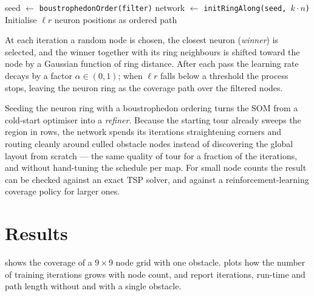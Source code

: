 \begin{algorithm}[H]
\caption{\texttt{generateCoveragePath} --- seeded SOM path planner}
seed $\leftarrow$ \texttt{boustrophedonOrder(filter)} 
network $\leftarrow$ \texttt{initRingAlong(seed, $k \cdot n$)} 
Initialise $\ell r$\;
\Return neuron positions as ordered path\;
\end{algorithm}

At each iteration a random node is chosen, the closest neuron (\emph{winner}) is
selected, and the winner together with its ring neighbours is shifted toward the
node by a Gaussian function of ring distance. After each pass the learning rate
decays by a factor $\alpha\in(0,1)$; when $\ell r$ falls below a threshold the
process stops, leaving the neuron ring as the coverage path over the filtered
nodes.

\begin{highlight}
Seeding the neuron ring with a boustrophedon ordering turns the SOM from a
cold-start optimiser into a \emph{refiner}. Because the starting tour already
sweeps the region in rows, the network spends its iterations straightening
corners and routing cleanly around culled obstacle nodes instead of discovering
the global layout from scratch --- the same quality of tour for a fraction of the
iterations, and without hand-tuning the schedule per map. For small node counts
the result can be checked against an exact TSP solver, and against a
reinforcement-learning coverage policy for larger ones.
\end{highlight}

\section{Results}
 shows the coverage of a $9\times9$ node grid with one
obstacle.  plots how the number of training iterations grows with
node count, and  report iterations, run-time and path
length without and with a single obstacle.

